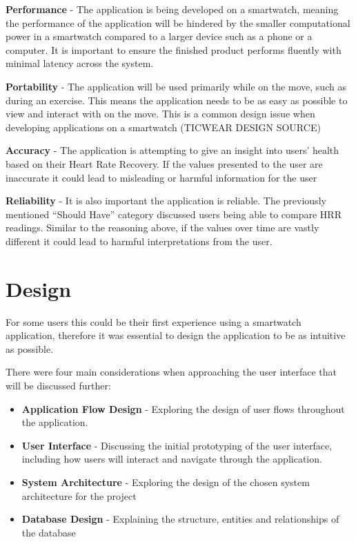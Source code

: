 \documentclass{l4proj}
\begin{document}
\textbf{Performance} - The application is being developed on a smartwatch, meaning the performance of the application will be hindered by the smaller computational power in a smartwatch compared to a larger device such as a phone or a computer. It is important to ensure the finished product performs fluently with minimal latency across the system.

\textbf{Portability} -  The application will be used primarily while on the move, such as during an exercise. This means the application needs to be as easy as possible to view and interact with on the move. This is a common design issue when developing applications on a smartwatch (TICWEAR DESIGN SOURCE)

\textbf{Accuracy} - The application is attempting to give an insight into users' health based on their Heart Rate Recovery. If the values presented to the user are inaccurate it could lead to misleading or harmful information for the user

\textbf{Reliability} - It is also important the application is reliable. The previously mentioned “Should Have” category discussed users being able to compare HRR readings. Similar to the reasoning above, if the values over time are vastly different it could lead to harmful interpretations from the user.

\chapter{Design}

For some users this could be their first experience using a smartwatch application, therefore it was essential to design the application to be as intuitive as possible. 

There were four main considerations when approaching the user interface that will be discussed further:

\begin{itemize}
    \item \textbf{Application Flow Design} - Exploring the design of user flows throughout the application.
    \item \textbf{User Interface} - Discussing the initial prototyping of the user interface, including how users will interact and navigate through the application.
    \item \textbf{System Architecture} - Exploring the design of the chosen system architecture for the project
    \item \textbf{Database Design} - Explaining the structure, entities and relationships of the database
\end{itemize}
\end{document}
